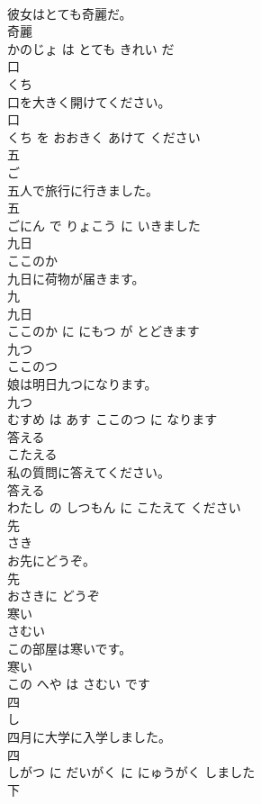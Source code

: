 \documentclass[8pt]{extreport}
\begin{document}
\begin{CJK}{UTF8}{min}
\\	彼女はとても奇麗だ。	
\\	奇麗 
\\	かのじょ は とても きれい だ			
\\	口	
\\	くち			
\\	口を大きく開けてください。	
\\	口 
\\	くち を おおきく あけて ください			
\\	五	
\\	ご			
\\	五人で旅行に行きました。	
\\	五 
\\	ごにん で りょこう に いきました			
\\	九日	
\\	ここのか			
\\	九日に荷物が届きます。	
\\	九 
\\	九日 
\\	ここのか に にもつ が とどきます			
\\	九つ	
\\	ここのつ			
\\	娘は明日九つになります。	
\\	九つ 
\\	むすめ は あす ここのつ に なります			
\\	答える	
\\	こたえる			
\\	私の質問に答えてください。	
\\	答える 
\\	わたし の しつもん に こたえて ください			
\\	先	
\\	さき			
\\	お先にどうぞ。	
\\	先 
\\	おさきに どうぞ			
\\	寒い	
\\	さむい			
\\	この部屋は寒いです。	
\\	寒い 
\\	この へや は さむい です			
\\	四	
\\	し			
\\	四月に大学に入学しました。	
\\	四 
\\	しがつ に だいがく に にゅうがく しました			
\\	下	

\end{CJK}
\end{document}
